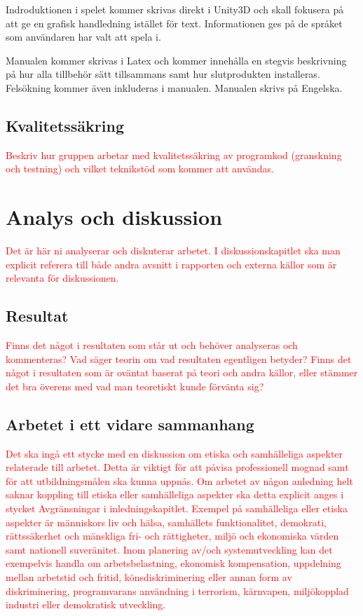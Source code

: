 \documentclass[a4paper,12pt,oneside,final]{extbook}
\begin{document}
Indroduktionen i spelet kommer skrivas direkt i Unity3D och skall fokusera på att ge en grafisk handledning istället för text. Informationen ges på de språket som användaren har valt att spela i.

Manualen kommer skrivas i Latex och kommer innehålla en stegvis beskrivning på hur alla tillbehör sätt tillsammans samt hur slutprodukten installeras. Felsökning kommer även inkluderas i manualen. Manualen skrivs på Engelska.

\section{Kvalitetssäkring}

\textcolor{red}{Beskriv hur gruppen arbetar med kvalitetssäkring av programkod (granskning och testning) och vilket
teknikstöd som kommer att användas.
}

\chapter{Analys och diskussion}

\textcolor{red}{Det är här ni analyserar och diskuterar arbetet. I diskussionskapitlet ska man explicit referera till både
andra avsnitt i rapporten och externa källor som är relevanta för diskussionen.
}


\section{Resultat}

\textcolor{red}{Finns det något i resultaten som står ut och behöver analyseras och kommenteras? Vad säger teorin
om vad resultaten egentligen betyder? Finns det något i resultaten som är oväntat baserat på teori och
andra källor, eller stämmer det bra överens med vad man teoretiskt kunde förvänta sig?
}
\section{Arbetet i ett vidare sammanhang}

\textcolor{red}{Det ska ingå ett stycke med en diskussion om etiska och samhälleliga aspekter relaterade till arbetet.
Detta är viktigt för att påvisa professionell mognad samt för att utbildningsmålen ska kunna uppnås.
Om arbetet av någon anledning helt saknar koppling till etiska eller samhälleliga aspekter ska detta
explicit anges i stycket Avgränsningar i inledningskapitlet.
Exempel på samhälleliga eller etiska aspekter är människors liv och hälsa, samhällets funktionalitet,
demokrati, rättssäkerhet och mänskliga fri- och rättigheter, miljö och ekonomiska värden samt
nationell suveränitet. Inom planering av/och systemutveckling kan det exempelvis handla om arbetsbelastning,
ekonomisk kompensation, uppdelning mellan arbetstid och fritid, könsdiskriminering eller
annan form av diskriminering, programvarans användning i terrorism, kärnvapen, miljökopplad industri
eller demokratisk utveckling.}
\end{document}
